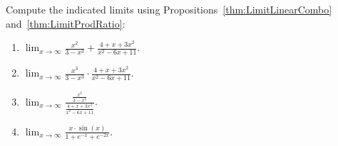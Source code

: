 \begin{example} Compute the indicated limits using Propositions~\ref{thm:LimitLinearCombo} and~\ref{thm:LimitProdRatio}:

\begin{enumerate}
\renewcommand{\labelenumi}{(\alph{enumi})}
\setlength{\itemsep}{.2cm}

\item  $\displaystyle \lim_{x \to \infty} \frac{x^2}{3 - x^3} + \frac{4 + x + 3x^2}{x^2 -6x + 11}$.

\item  $\displaystyle \lim_{x \to \infty} \frac{x^3}{3 - x^3} \cdot \frac{4 + x + 3x^2}{x^2 -6x + 11}$.

\item  $\displaystyle \lim_{x \to \infty} \frac{\frac{x^2}{3 - x^3}}{\frac{4 + x + 3x^2}{x^2 -6x + 11}}$.
    
\item   $\displaystyle \lim_{x \to \infty} \frac{x \cdot \sin(x)}{1 + e^{-x} + e^{-2x}}$.
\end{enumerate}  
\end{example}

\solution 

